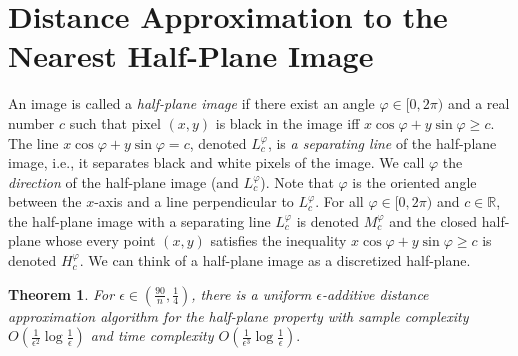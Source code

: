 \documentclass[11pt,english]{article}
\newtheorem{theorem}{Theorem}[section]
\numberwithin{figure}{section}
\newcommand{\eps}{{\epsilon}}
\newcommand{\hp}[2]{H^{#1}_{#2}}\newcommand{\sepline}[2]{L^{#1}_{#2}}\newcommand{\hpi}[2]{M^{#1}_{#2}}\newcommand{\myerr}[1]{Err(#1)}
\newcommand{\mydelta}{\epsilon} \newcommand{\bigdelta}{{\epsilon_0}} \newcommand{\dsquares}{d_{\rm squares}}
\begin{document}
\section{Distance Approximation to the Nearest Half-Plane Image}\label{sec:half-plane}
{\color{black} 
{\color{black} An image is called a \emph{half-plane image}} if there exist an angle $\varphi\in[0,2\pi)$ and a real number $c$ such that pixel $(x,y)$ is black in the image iff $x\cos\varphi +y\sin\varphi\geq c$. The line $x\cos\varphi +y\sin\varphi= c$, denoted $\sepline{\varphi}{c}$, is {\em a separating line} of the half-plane image, i.e., it
separates black and white pixels of the image. We call $\varphi$ the {\em direction} of the half-plane image (and $\sepline{\varphi}{c}$). Note that $\varphi$ is the oriented angle between the $x$-axis and a line perpendicular to $\sepline{\varphi}{c}$. For all $\varphi\in[0,2\pi)$ and $c\in\mathbb R$, the half-plane image with a separating line $\sepline{\varphi}{c}$ is denoted $\hpi{\varphi}{c}$ and the closed half-plane whose every point $(x,y)$ satisfies the inequality $x\cos\varphi +y\sin\varphi \geq c$ is denoted $\hp{\varphi}{c}$. We can think of a half-plane image as a discretized half-plane.
 
}
\begin{theorem}\label{thm:half-plane-dist-appr}
For $\eps\in(\frac{90}n,\frac 1 4)$, there is a uniform $\mydelta$-additive distance approximation algorithm for the half-plane property with sample complexity  $O(\frac{1}{\mydelta^2}\log\frac{1}{\mydelta})$ and time complexity $O(\frac{1}{\mydelta^{3}}\log \frac{1}{\mydelta}).$
\end{theorem}
\end{document}
